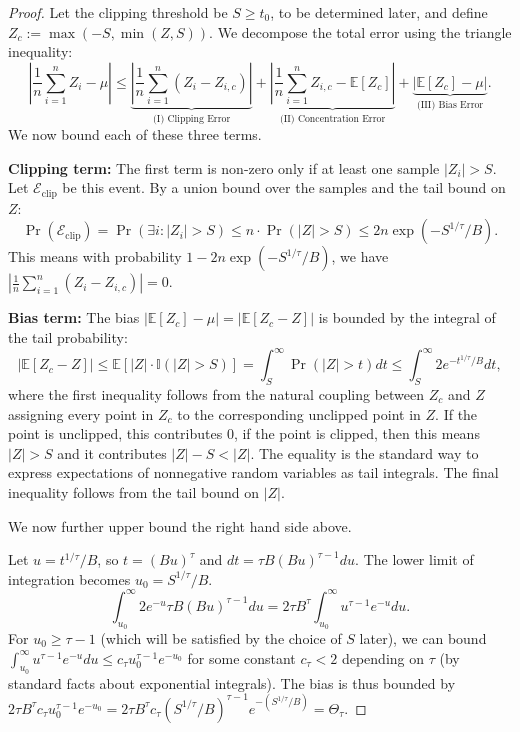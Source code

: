 \documentclass[10pt,a4paper]{amsart}
\newcommand{\E}{\mathbb{E}}
\begin{document}
\begin{proof}
Let the clipping threshold be $S \geq t_0$, to be determined later, and define $Z_c := \max(-S, \min(Z, S))$. 
We decompose the total error using the triangle inequality:
\[
\left|\frac{1}{n}\sum_{i=1}^n Z_i - \mu\right| \le \underbrace{\left|\frac{1}{n}\sum_{i=1}^n (Z_i - Z_{i,c})\right|}_{\text{(I) Clipping Error}} + \underbrace{\left|\frac{1}{n}\sum_{i=1}^n Z_{i,c} - \E[Z_c]\right|}_{\text{(II) Concentration Error}} + \underbrace{|\E[Z_c] - \mu|}_{\text{(III) Bias Error}}.
\]
We now bound each of these three terms.

\textbf{Clipping term:} 
The first term is non-zero only if at least one sample $|Z_i| > S$. 
Let $\mathcal{E}_{\text{clip}}$ be this event. 
By a union bound over the samples and the tail bound on $Z$:
\[
\Pr(\mathcal{E}_{\text{clip}}) = \Pr(\exists i: |Z_i| > S) \le n \cdot \Pr(|Z| > S) \le 2n \exp(-S^{1/\tau}/B).
\]
This means with probability $1-2n \exp(-S^{1/\tau}/B)$, we have $\left|\frac{1}{n}\sum_{i=1}^n (Z_i - Z_{i,c})\right| = 0$.

\textbf{Bias term:} The bias $|\E[Z_c] - \mu| = |\E[Z_c - Z]|$ is bounded by the integral of the tail probability:
\[
|\E[Z_c - Z]| \le \E[|Z| \cdot \mathbb{I}(|Z|>S)] = \int_S^\infty \Pr(|Z|>t)dt \le \int_S^\infty 2e^{-t^{1/\tau}/B}dt,
\]
where the first inequality follows from the natural coupling between $Z_c$ and $Z$ assigning every point in $Z_c$ to the corresponding unclipped point in $Z$. 
If the point is unclipped, this contributes $0$,
if the point is clipped, then this means $|Z| > S$ and it contributes $|Z|-S < |Z|$. 
The equality is the standard way to express expectations of nonnegative random variables as tail integrals. 
The final inequality follows from the tail bound on $|Z|$. 

We now further upper bound the right hand side above.

Let $u = t^{1/\tau}/B$, so $t = (Bu)^\tau$ and $dt = \tau B (Bu)^{\tau-1} du$. 
The lower limit of integration becomes $u_0 = S^{1/\tau}/B$.
\[
\int_{u_0}^\infty 2e^{-u} \tau B (Bu)^{\tau-1} du = 2\tau B^\tau \int_{u_0}^\infty u^{\tau-1} e^{-u} du.
\]
For $u_0 \ge \tau-1$ (which will be satisfied by the choice of \(S\) later), 
we can bound $\int_{u_0}^\infty u^{\tau-1} e^{-u} du \le c_\tau u_0^{\tau-1} e^{-u_0}$ for some constant $c_\tau < 2$ depending on $\tau$ 
(by standard facts about exponential integrals). 
The bias is thus bounded by $2\tau B^\tau c_\tau u_0^{\tau -1} e^{-u_0} = 2\tau B^\tau c_\tau (S^{1/\tau}/B)^{\tau -1} e^{-(S^{1/\tau}/B)} = \Theta_\tau$.



\end{proof}
\end{document}
